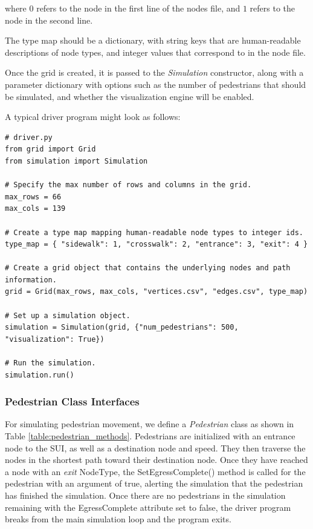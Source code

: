 \documentclass[12pt]{article}
\begin{document}
where $0$ refers to the node in the first line of the nodes file, and $1$ refers
to the node in the second line.

The type map should be a dictionary, with string keys that are human-readable
descriptions of node types, and integer values that correspond to %
in the node file.

Once the grid is created, it is passed to the \textit{Simulation} constructor,
along with a parameter dictionary with options such as the number of pedestrians
that should be simulated, and whether the visualization engine will be enabled.

A typical driver program might look as follows:

\begin{lstlisting}
# driver.py
from grid import Grid
from simulation import Simulation

# Specify the max number of rows and columns in the grid.
max_rows = 66
max_cols = 139

# Create a type map mapping human-readable node types to integer ids.
type_map = { "sidewalk": 1, "crosswalk": 2, "entrance": 3, "exit": 4 }

# Create a grid object that contains the underlying nodes and path information.
grid = Grid(max_rows, max_cols, "vertices.csv", "edges.csv", type_map)

# Set up a simulation object.
simulation = Simulation(grid, {"num_pedestrians": 500, "visualization": True})

# Run the simulation.
simulation.run()
\end{lstlisting}

\subsubsection{Pedestrian Class Interfaces}
For simulating pedestrian movement, we define a \textit{Pedestrian} class as
shown in Table \ref{table:pedestrian_methods}. Pedestrians are initialized with
an entrance node to the SUI, as well as a destination node and speed. They then
traverse the nodes in the shortest path toward their destination node. Once
they have reached a node with an \textit{exit} NodeType, the
SetEgressComplete() method is called for the pedestrian with an argument of
true, alerting the simulation that the pedestrian has finished the simulation.
Once there are no pedestrians in the simulation remaining with the
EgressComplete attribute set to false, the driver program breaks from the main
simulation loop and the program exits.
\end{document}
